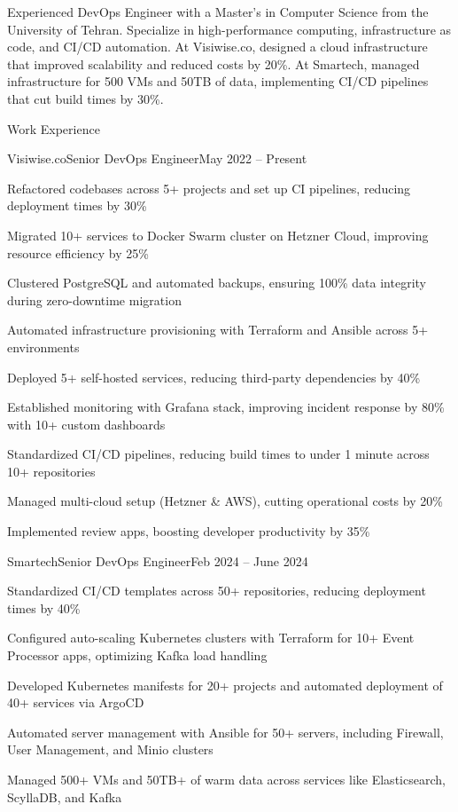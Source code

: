 \documentclass[]{main}
\begin{document}
\resumeheader
{}
{}
{}
{}
{}
{}

Experienced DevOps Engineer with a Master's in Computer Science from the University of Tehran. Specialize in high-performance computing, infrastructure as code, and CI/CD automation. At Visiwise.co, designed a cloud infrastructure that improved scalability and reduced costs by 20\%. At Smartech, managed infrastructure for 500 VMs and 50TB of data, implementing CI/CD pipelines that cut build times by 30\%.

\begin{section}{Work Experience}
 \begin{subsection}{Visiwise.co}{Senior DevOps Engineer}{May 2022 -- Present}{}
     \item Refactored codebases across 5+ projects and set up CI pipelines, reducing deployment times by 30\%
     \item Migrated 10+ services to Docker Swarm cluster on Hetzner Cloud, improving resource efficiency by 25\%
     \item Clustered PostgreSQL and automated backups, ensuring 100\% data integrity during zero-downtime migration
     \item Automated infrastructure provisioning with Terraform and Ansible across 5+ environments
     \item Deployed 5+ self-hosted services, reducing third-party dependencies by 40\%
     \item Established monitoring with Grafana stack, improving incident response by 80\% with 10+ custom dashboards
     \item Standardized CI/CD pipelines, reducing build times to under 1 minute across 10+ repositories
     \item Managed multi-cloud setup (Hetzner \& AWS), cutting operational costs by 20\%
     \item Implemented review apps, boosting developer productivity by 35\%
 \end{subsection}

 \begin{subsection}{Smartech}{Senior DevOps Engineer}{Feb 2024 -- June 2024}{}
     \item Standardized CI/CD templates across 50+ repositories, reducing deployment times by 40\%
     \item Configured auto-scaling Kubernetes clusters with Terraform for 10+ Event Processor apps, optimizing Kafka load handling
     \item Developed Kubernetes manifests for 20+ projects and automated deployment of 40+ services via ArgoCD
     \item Automated server management with Ansible for 50+ servers, including Firewall, User Management, and Minio clusters
     \item Managed 500+ VMs and 50TB+ of warm data across services like Elasticsearch, ScyllaDB, and Kafka
 \end{subsection}


\end{section}
\end{document}
